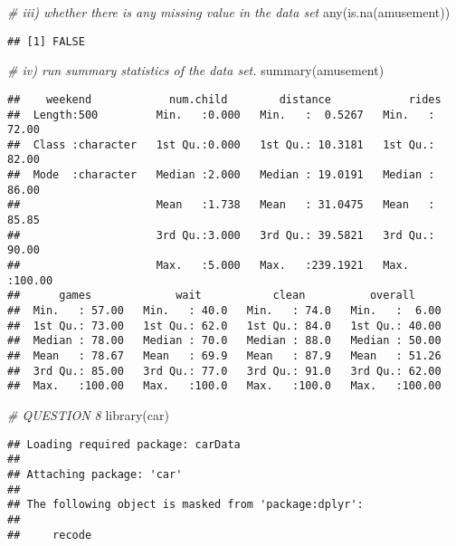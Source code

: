 \documentclass[
]{article}
\newenvironment{Shaded}{\begin{snugshade}}{\end{snugshade}}
\newcommand{\CommentTok}[1]{\textcolor[rgb]{0.56,0.35,0.01}{\textit{#1}}}
\newcommand{\FunctionTok}[1]{\textcolor[rgb]{0.00,0.00,0.00}{#1}}
\newcommand{\NormalTok}[1]{#1}
\begin{document}
\begin{Shaded}
\begin{Highlighting}[]
\CommentTok{\# iii) whether there is any missing value in the data set}
\FunctionTok{any}\NormalTok{(}\FunctionTok{is.na}\NormalTok{(amusement))}
\end{Highlighting}
\end{Shaded}

\begin{verbatim}
## [1] FALSE
\end{verbatim}

\begin{Shaded}
\begin{Highlighting}[]
\CommentTok{\# iv) run summary statistics of the data set.}
\FunctionTok{summary}\NormalTok{(amusement)}
\end{Highlighting}
\end{Shaded}

\begin{verbatim}
##    weekend            num.child        distance            rides       
##  Length:500         Min.   :0.000   Min.   :  0.5267   Min.   : 72.00  
##  Class :character   1st Qu.:0.000   1st Qu.: 10.3181   1st Qu.: 82.00  
##  Mode  :character   Median :2.000   Median : 19.0191   Median : 86.00  
##                     Mean   :1.738   Mean   : 31.0475   Mean   : 85.85  
##                     3rd Qu.:3.000   3rd Qu.: 39.5821   3rd Qu.: 90.00  
##                     Max.   :5.000   Max.   :239.1921   Max.   :100.00  
##      games             wait           clean          overall      
##  Min.   : 57.00   Min.   : 40.0   Min.   : 74.0   Min.   :  6.00  
##  1st Qu.: 73.00   1st Qu.: 62.0   1st Qu.: 84.0   1st Qu.: 40.00  
##  Median : 78.00   Median : 70.0   Median : 88.0   Median : 50.00  
##  Mean   : 78.67   Mean   : 69.9   Mean   : 87.9   Mean   : 51.26  
##  3rd Qu.: 85.00   3rd Qu.: 77.0   3rd Qu.: 91.0   3rd Qu.: 62.00  
##  Max.   :100.00   Max.   :100.0   Max.   :100.0   Max.   :100.00
\end{verbatim}

\begin{Shaded}
\begin{Highlighting}[]
\CommentTok{\# QUESTION 8}
\FunctionTok{library}\NormalTok{(car)}
\end{Highlighting}
\end{Shaded}

\begin{verbatim}
## Loading required package: carData
## 
## Attaching package: 'car'
## 
## The following object is masked from 'package:dplyr':
## 
##     recode
\end{verbatim}
\end{document}
